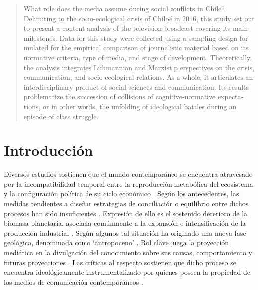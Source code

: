 \documentclass{textolivre}
\begin{document}
\begin{polyabstract}
\begin{english}
\begin{abstract}
What role does the media assume during social conflicts in Chile? Delimiting
to the socio-ecological crisis of Chiloé in 2016, this study set out to present a content
analysis of the television broadcast covering its main milestones. Data for this study were
collected using a sampling design formulated for the empirical comparison of journalistic
material based on its normative criteria, type of media, and stage of development.
Theoretically, the analysis integrates Luhmannian and Marxist p erspectives on the crisis,
communication, and socio-ecological relations. As a whole, it articulates an
interdisciplinary product of social sciences and communication. Its results problematize the
succession of collisions of cognitive-normative expectations, or in other words, the
unfolding of ideological battles during an episode of class struggle.

\end{abstract}
\end{english}

\end{polyabstract}


\section{Introducción}\label{sec-intro}
Diversos estudios sostienen que el mundo contemporáneo se encuentra
atravesado por la incompatibilidad temporal entre la reproducción metabólica del
ecosistema y la configuración política de su ciclo económico \cite{arboleda,Mascareo2018}.
Según los antecedentes, las medidas tendientes a diseñar
estrategias de conciliación o equilibrio entre dichos procesos han sido insuficientes
\cite{Folke2016}. Expresión de ello es el sostenido deterioro de la biomasa planetaria,
asociada comúnmente a la expansión e intensificación de la producción industrial \cite{ipcc2013,Kamjunke2017}. 
Según algunos tal situación ha originado una nueva fase
geológica, denominada como ‘antropoceno’ \cite{Foster2016}. Rol clave juega la
proyección mediática en la divulgación del conocimiento sobre sus causas,
comportamiento y futuras proyecciones \cite{billi2017}. Las críticas al
respecto sostienen que dicho proceso se encuentra ideológicamente instrumentalizado
por quienes poseen la propiedad de los medios de comunicación contemporáneos
\cite{Gunderson2019}.
\end{document}
